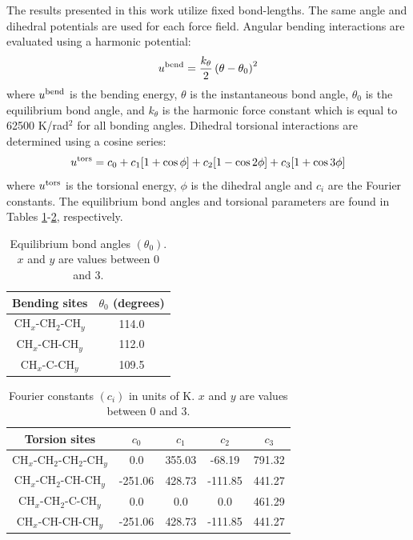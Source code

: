 \documentclass[preprint,review,12pt]{elsarticle}
\begin{document}
    The results presented in this work utilize fixed bond-lengths. The same angle and dihedral potentials are used for each force field. Angular bending interactions are evaluated using a harmonic potential:
	\begin{equation}
	u^{\rm bend} = \frac{k_\theta}{2} \left(\theta-\theta_0\right)^2
	\end{equation}
	where $u^{\rm bend}$ is the bending energy, $\theta$ is the instantaneous bond angle, $\theta_0$ is the equilibrium bond angle, and $k_\theta$ is the harmonic force constant which is equal to 62500 K/rad$^2$ for all bonding angles. Dihedral torsional interactions are determined using a cosine series:
	\begin{equation}
	u^{\rm tors} = c_0 + c_1 [1+\cos{\phi}] + c_2 [1-\cos{2\phi}] + c_3 [1+\cos{3\phi}]
	\end{equation}
	where $u^{\rm tors}$ is the torsional energy, $\phi$ is the dihedral angle and $c_i$ are the Fourier constants. The equilibrium bond angles and torsional parameters are found in Tables \ref{tab:angles}-\ref{tab:torsions}, respectively. 
	\begin{table}[h!]
		\caption{Equilibrium bond angles $(\theta_0)$. $x$ and $y$ are values between 0 and 3.} \label{tab:angles}
		\begin{center}
			\begin{tabular}{|c|c|}
				\hline
				Bending sites & $\theta_0$ (degrees) \\ \hline
				CH$_x$-CH$_2$-CH$_y$ & 114.0 \\ 
				CH$_x$-CH-CH$_y$ & 112.0 \\ 
				CH$_x$-C-CH$_y$ & 109.5 \\  
				\hline
			\end{tabular}
		\end{center} 
	\end{table}
	
	\begin{table}[h!]
		\caption{Fourier constants $(c_i)$ in units of K. $x$ and $y$ are values between 0 and 3.} \label{tab:torsions}
		\begin{center}
			\begin{tabular}{|c|c|c|c|c|}
				\hline
				Torsion sites & $c_0$ & $c_1$ & $c_2$ & $c_3$ \\ \hline
				CH$_x$-CH$_2$-CH$_2$-CH$_y$ & 0.0 & 355.03 & -68.19 & 791.32 \\ 
				CH$_x$-CH$_2$-CH-CH$_y$ & -251.06 & 428.73 & -111.85 & 441.27 \\
				CH$_x$-CH$_2$-C-CH$_y$ & 0.0 & 0.0 & 0.0 & 461.29 \\
				CH$_x$-CH-CH-CH$_y$ & -251.06 & 428.73 & -111.85 & 441.27 \\
				\hline
			\end{tabular}
		\end{center} 
	\end{table}
\end{document}
